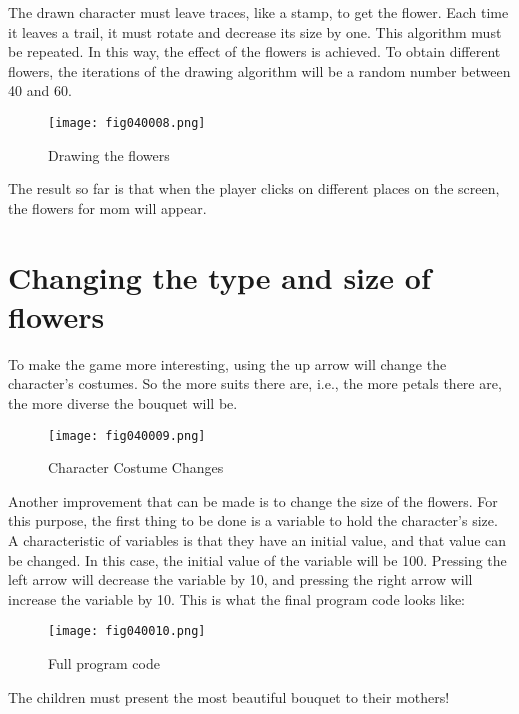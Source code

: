 The drawn character must leave traces, like a stamp, to get the flower. Each time it leaves a trail, it must rotate and decrease its size by one. This algorithm must be repeated. In this way, the effect of the flowers is achieved. To obtain different flowers, the iterations of the drawing algorithm will be a random number between 40 and 60.

\begin{figure}[H]
   \centering
   \texttt{[image: fig040008.png]}
   \caption{Drawing the flowers}
\label{fig040008}
\end{figure}

The result so far is that when the player clicks on different places on the screen, the flowers for mom will appear.

\section{Changing the type and size of flowers}

To make the game more interesting, using the up arrow will change the character's costumes. So the more suits there are, i.e., the more petals there are, the more diverse the bouquet will be.

\begin{figure}[H]
   \centering
   \texttt{[image: fig040009.png]}
   \caption{Character Costume Changes}
\label{fig040009}
\end{figure}

Another improvement that can be made is to change the size of the flowers. For this purpose, the first thing to be done is a variable to hold the character's size. A characteristic of variables is that they have an initial value, and that value can be changed. In this case, the initial value of the variable will be 100. Pressing the left arrow will decrease the variable by 10, and pressing the right arrow will increase the variable by 10. This is what the final program code looks like:

\begin{figure}[H]
   \centering
   \texttt{[image: fig040010.png]}
   \caption{Full program code}
\label{fig040010}
\end{figure}

The children must present the most beautiful bouquet to their mothers!
